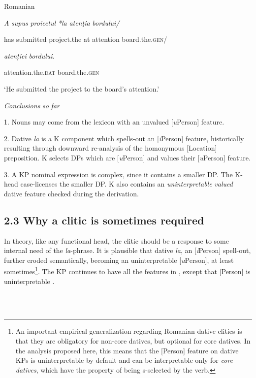 \documentclass[output=paper,modfonts,nonflat]{langsci/langscibook}
\begin{document}
          Romanian

\textit{A} \textit{supus}    \textit{proiectul}  \textit{*la} \textit{atenţia}   \textit{bordului/}

  has submitted  project.the  at attention   board.the.\textsc{gen}/ 

  \textit{atenției}      \textit{bordului.}

attention.the.\textsc{dat}  board.the.\textsc{gen}

  ‘He submitted the project to the board’s attention.’

\textit{Conclusions} \textit{so} \textit{far}

1. Nouns may come from the lexicon with an unvalued [\textit{u}Person] feature. 

2. Dative \textit{la} is a K component which spells-out an [\textit{i}Person] feature, historically resulting through downward re-analysis of the homonymous [Location] preposition. K selects DPs which are [\textit{u}Person] and values their [\textit{u}Person] feature.

3. A KP nominal expression is complex, since it contains a smaller DP. The K-head case-licenses the smaller DP. K also contains an \textit{uninterpretable} \textit{valued} dative feature checked during the derivation.

\subsection{\textbf{2.3} \textbf{Why} \textbf{a} \textbf{clitic} \textbf{is} \textbf{sometimes} \textbf{required}}

In theory, like any functional head, the clitic should be a response to some internal need of the \textit{la}{}-phrase. It is plausible that dative \textit{la}, an [\textit{i}Person] spell-out, further eroded semantically, becoming an uninterpretable [\textit{u}Person], at least sometimes\footnote{An important empirical generalization \citep{Cornilescu2017} regarding Romanian dative clitics is that they are obligatory for non-core datives, but optional for core datives. In the analysis proposed here, this means that the [Person] feature on dative KPs is uninterpretable by default and can be interpretable only for \textit{core} \textit{datives}, which have the property of being s-selected by the verb.}. The KP continues to have all the features in , except that [Person] is uninterpretable .

\ea%
    \label{ex:key:20}
    \gll\\
        \\
    \glt
    \z
\end{document}
